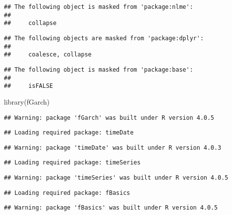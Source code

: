 \documentclass[
]{article}
\newenvironment{Shaded}{\begin{snugshade}}{\end{snugshade}}
\newcommand{\FunctionTok}[1]{\textcolor[rgb]{0.00,0.00,0.00}{#1}}
\newcommand{\NormalTok}[1]{#1}
\begin{document}
\begin{verbatim}
## The following object is masked from 'package:nlme':
## 
##     collapse
\end{verbatim}

\begin{verbatim}
## The following objects are masked from 'package:dplyr':
## 
##     coalesce, collapse
\end{verbatim}

\begin{verbatim}
## The following object is masked from 'package:base':
## 
##     isFALSE
\end{verbatim}

\begin{Shaded}
\begin{Highlighting}[]
\FunctionTok{library}\NormalTok{(fGarch)}
\end{Highlighting}
\end{Shaded}

\begin{verbatim}
## Warning: package 'fGarch' was built under R version 4.0.5
\end{verbatim}

\begin{verbatim}
## Loading required package: timeDate
\end{verbatim}

\begin{verbatim}
## Warning: package 'timeDate' was built under R version 4.0.3
\end{verbatim}

\begin{verbatim}
## Loading required package: timeSeries
\end{verbatim}

\begin{verbatim}
## Warning: package 'timeSeries' was built under R version 4.0.5
\end{verbatim}

\begin{verbatim}
## Loading required package: fBasics
\end{verbatim}

\begin{verbatim}
## Warning: package 'fBasics' was built under R version 4.0.5
\end{verbatim}
\end{document}
